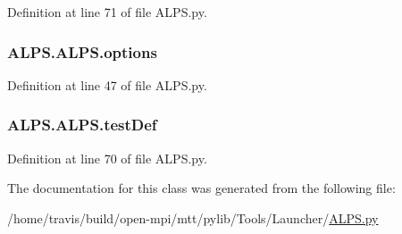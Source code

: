 Definition at line 71 of file A\-L\-P\-S.\-py.

\hypertarget{class_a_l_p_s_1_1_a_l_p_s_a24dfa9b508f507c4cb6148f10a081555}{
\subsubsection[{options}]{\setlength{\rightskip}{0pt plus 5cm}A\-L\-P\-S.\-A\-L\-P\-S.\-options}}\label{class_a_l_p_s_1_1_a_l_p_s_a24dfa9b508f507c4cb6148f10a081555}


Definition at line 47 of file A\-L\-P\-S.\-py.

\hypertarget{class_a_l_p_s_1_1_a_l_p_s_a839c4f84a46683221d51004c08345ff2}{
\subsubsection[{test\-Def}]{\setlength{\rightskip}{0pt plus 5cm}A\-L\-P\-S.\-A\-L\-P\-S.\-test\-Def}}\label{class_a_l_p_s_1_1_a_l_p_s_a839c4f84a46683221d51004c08345ff2}


Definition at line 70 of file A\-L\-P\-S.\-py.



The documentation for this class was generated from the following file\-:\begin{DoxyCompactItemize}
\item 
/home/travis/build/open-\/mpi/mtt/pylib/\-Tools/\-Launcher/\hyperlink{_a_l_p_s_8py}{A\-L\-P\-S.\-py}\end{DoxyCompactItemize}
